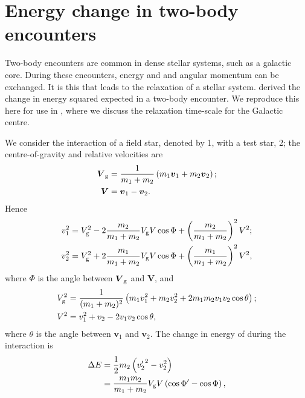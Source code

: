 \chapter{Energy change in two-body encounters}\label{ch:Chandra}

Two-body encounters are common in dense stellar systems, such as a galactic core. During these encounters, energy and and angular momentum can be exchanged. It is this that leads to the relaxation of a stellar system. \citet[chapter 2]{Chandrasekhar1960} derived the change in energy squared expected in a two-body encounter. We reproduce this here for use in , where we discuss the relaxation time-scale for the Galactic centre.

We consider the interaction of a field star, denoted by 1, with a test star, 2; the centre-of-gravity and relative velocities are
\begin{subequations}
\begin{align}
\boldsymbol{V}_\mathrm{g} = {} & \frac{1}{m_1 + m_2}\left(m_1 \boldsymbol{v}_1 + m_2 \boldsymbol{v}_2\right);\\
\boldsymbol{V} = {} & \boldsymbol{v}_1 - \boldsymbol{v}_2.
\end{align}
\label{eq:Vs}
\end{subequations}
Hence
\begin{subequations}
\begin{align}
v_1^2 = {} & V_\mathrm{g}^2 - 2\frac{m_2}{m_1 + m_2}V_\mathrm{g}V \cos\Phi + \left(\frac{m_2}{m_1 + m_2}\right)^2V^2;\\
v_2^2 = {} & V_\mathrm{g}^2 + 2\frac{m_1}{m_1 + m_2}V_\mathrm{g}V \cos\Phi + \left(\frac{m_1}{m_1 + m_2}\right)^2V^2,
\end{align}
\end{subequations}
where $\Phi$ is the angle between $\boldsymbol{V}_\mathrm{g}$ and $\boldsymbol{V}$, and
\begin{subequations}
\begin{align}
V_\mathrm{g}^2 = {} & \frac{1}{(m_1 + m_2)^2}\left(m_1v_1^2 + m_2v_2^2 + 2 m_1 m_2 v_1 v_2 \cos\theta\right);\\
V^2 = {} & v_1^2 + v_2 - 2 v_1 v_2 \cos\theta,
\end{align}
\label{eq:V2s}
\end{subequations}
where $\theta$ is the angle between $\boldsymbol{v}_1$ and $\boldsymbol{v}_2$. The change in energy of during the interaction is
\begin{align}
\Delta E = {} & \frac{1}{2} m_2 \left({v'_2}^2 - v_2^2\right)\\
 = {} & \frac{m_1 m_2}{m_1 + m_2}V_\mathrm{g}V\left(\cos\Phi' - \cos\Phi\right),
\end{align}
